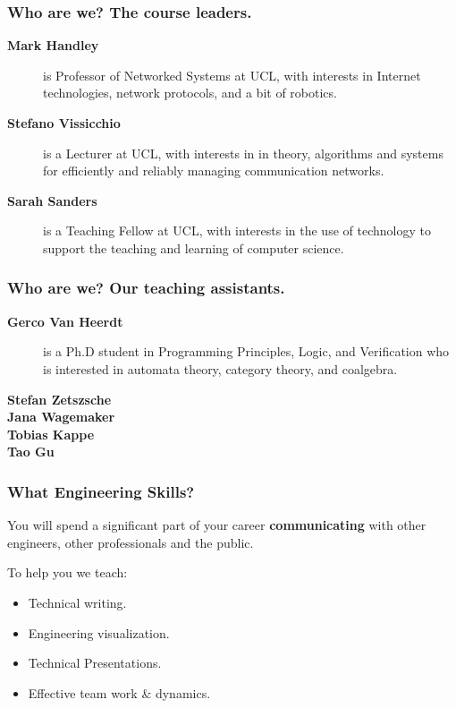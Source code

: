 \documentclass{beamer} %
\newcommand\emc[1]{\textcolor{midred}{\textbf{#1}}}
\begin{document}
\begin{frame}
\frametitle{Who are we? The course leaders.} 

\begin{description}
\item[{\bf Mark Handley}] is Professor of Networked Systems at UCL, with interests in Internet technologies, network protocols, and a bit of robotics.
\item[{\bf Stefano Vissicchio}] is a Lecturer at UCL, with interests in in theory, algorithms and systems for efficiently and reliably managing communication networks.
\item[{\bf Sarah Sanders}] is a Teaching Fellow at UCL, with interests in the use of technology to support the teaching and learning of computer science.
\end{description}

\end{frame}

\begin{frame}
\frametitle{Who are we? Our teaching assistants.} 

\begin{description}
\item[{\bf Gerco Van Heerdt}] is a Ph.D student in Programming Principles, Logic, and Verification who is interested in automata theory, category theory, and coalgebra.
\item[{\bf Stefan Zetszsche}]
\item[{\bf Jana Wagemaker}]
\item[{\bf Tobias Kappe}]
\item[{\bf Tao Gu}]
\end{description}

\end{frame}


\begin{frame}
\frametitle{What Engineering Skills?} 

You will spend a significant part of your career \emc{communicating} with other engineers, other professionals and the public.

\vspace{3mm}
To help you we teach:
\begin{itemize}
\item Technical writing.
\item Engineering visualization.
\item Technical Presentations.
\item Effective team work \& dynamics.
\end{itemize}
\end{frame}
\end{document}
